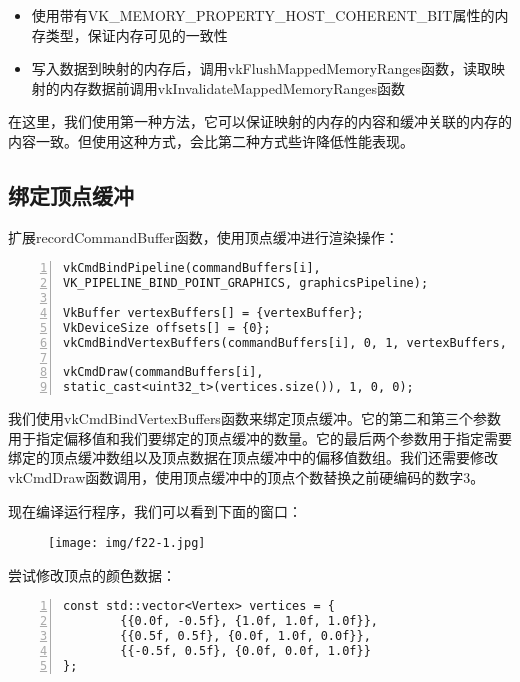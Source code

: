 \documentclass{ctexart}
\begin{document}
\begin{itemize}
	\item 使用带有VK\_MEMORY\_PROPERTY\_HOST\_COHERENT\_BIT属性的内存类型，保证内存可见的一致性
	\item 写入数据到映射的内存后，调用vkFlushMappedMemoryRanges函数，读取映射的内存数据前调用vkInvalidateMappedMemoryRanges函数
\end{itemize}

在这里，我们使用第一种方法，它可以保证映射的内存的内容和缓冲关联的内存的内容一致。但使用这种方式，会比第二种方式些许降低性能表现。

\subsection{绑定顶点缓冲}

扩展recordCommandBuffer函数，使用顶点缓冲进行渲染操作：

\begin{lstlisting}[language={[ANSI]C},keywordstyle=\color{blue!70},commentstyle=\color{red!50!green!50!blue!50},frame=shadowbox, rulesepcolor=\color{red!20!green!20!blue!20},basicstyle=\small,numbers=left, numberstyle=\tiny,breaklines=true]
vkCmdBindPipeline(commandBuffers[i],
VK_PIPELINE_BIND_POINT_GRAPHICS, graphicsPipeline);

VkBuffer vertexBuffers[] = {vertexBuffer};
VkDeviceSize offsets[] = {0};
vkCmdBindVertexBuffers(commandBuffers[i], 0, 1, vertexBuffers, offsets);

vkCmdDraw(commandBuffers[i],
static_cast<uint32_t>(vertices.size()), 1, 0, 0);
\end{lstlisting}

我们使用vkCmdBindVertexBuffers函数来绑定顶点缓冲。它的第二和第三个参数用于指定偏移值和我们要绑定的顶点缓冲的数量。它的最后两个参数用于指定需要绑定的顶点缓冲数组以及顶点数据在顶点缓冲中的偏移值数组。我们还需要修改vkCmdDraw函数调用，使用顶点缓冲中的顶点个数替换之前硬编码的数字3。

现在编译运行程序，我们可以看到下面的窗口：

\begin{figure}[H]
	\centering
	\texttt{[image: img/f22-1.jpg]}
\end{figure}

尝试修改顶点的颜色数据：

\begin{lstlisting}[language={[ANSI]C},keywordstyle=\color{blue!70},commentstyle=\color{red!50!green!50!blue!50},frame=shadowbox, rulesepcolor=\color{red!20!green!20!blue!20},basicstyle=\small,numbers=left, numberstyle=\tiny,breaklines=true]
const std::vector<Vertex> vertices = {
		{{0.0f, -0.5f}, {1.0f, 1.0f, 1.0f}},
		{{0.5f, 0.5f}, {0.0f, 1.0f, 0.0f}},
		{{-0.5f, 0.5f}, {0.0f, 0.0f, 1.0f}}
};
\end{lstlisting}
\end{document}
